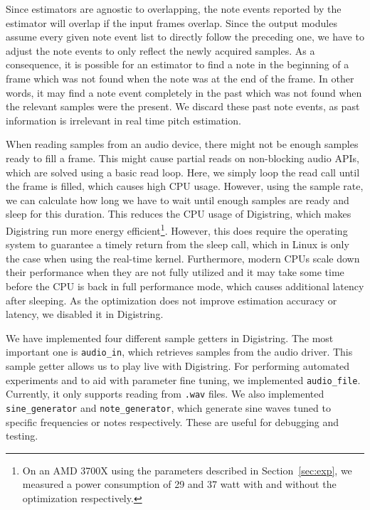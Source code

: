 \documentclass[a4paper,10pt,twocolumn]{article}
\begin{document}
Since estimators are agnostic to overlapping, the note events reported by the estimator will overlap if the input frames overlap. Since the output modules assume every given note event list to directly follow the preceding one, we have to adjust the note events to only reflect the newly acquired samples. As a consequence, it is possible for an estimator to find a note in the beginning of a frame which was not found when the note was at the end of the frame. In other words, it may find a note event completely in the past which was not found when the relevant samples were the present. We discard these past note events, as past information is irrelevant in real time pitch estimation.

When reading samples from an audio device, there might not be enough samples ready to fill a frame. This might cause partial reads on non-blocking audio APIs, which are solved using a basic read loop. Here, we simply loop the read call until the frame is filled, which causes high CPU usage. However, using the sample rate, we can calculate how long we have to wait until enough samples are ready and sleep for this duration. This reduces the CPU usage of Digistring, which makes Digistring run more energy efficient\footnote{On an AMD 3700X using the parameters described in Section~\ref{sec:exp}, we measured a power consumption of 29 and 37 watt with and without the optimization respectively.}. However, this does require the operating system to guarantee a timely return from the sleep call, which in Linux is only the case when using the real-time kernel. Furthermore, modern CPUs scale down their performance when they are not fully utilized and it may take some time before the CPU is back in full performance mode, which causes additional latency after sleeping. As the optimization does not improve estimation accuracy or latency, we disabled it in Digistring.

We have implemented four different sample getters in Digistring. The most important one is \texttt{audio\_in}, which retrieves samples from the audio driver. This sample getter allows us to play live with Digistring. For performing automated experiments and to aid with parameter fine tuning, we implemented \texttt{audio\_file}. Currently, it only supports reading from \texttt{.wav} files. We also implemented \texttt{sine\_generator} and \texttt{note\_generator}, which generate sine waves tuned to specific frequencies or notes respectively. These are useful for debugging and testing. %
\end{document}
